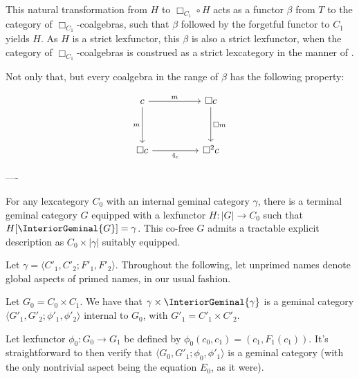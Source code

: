 This natural transformation from $H$ to $\Box_{C_1} \circ H$ acts as a functor $\beta$ from $T$ to the category of $\Box_{C_1}$-coalgebras, such that $\beta$ followed by the forgetful functor to $C_1$ yields $H$. As $H$ is a strict lexfunctor, this $\beta$ is also a strict lexfunctor, when the category of $\Box_{C_1}$-coalgebras is construed as a strict lexcategory in the manner of .

Not only that, but every coalgebra in the range of $\beta$ has the following property:

\[\begin{tikzcd}
	c && {\Box c} \\
	\\
	{\Box c} && {\Box^2 c}
	\arrow["m"', from=1-1, to=3-1]
	\arrow["m", from=1-1, to=1-3]
	\arrow["{\Box m}", from=1-3, to=3-3]
	\arrow["{4_c}"', from=3-1, to=3-3]
\end{tikzcd}\]

\closeDetails

----


\begin{construction}
For any lexcategory $C_0$ with an internal geminal category $\gamma$, there is a terminal geminal category $G$ equipped with a lexfunctor $H : |G| \to C_0$ such that $H[\InteriorGeminal{G}] = \gamma$. This co-free $G$ admits a tractable explicit description as $C_0 \times |\gamma|$ suitably equipped.
\end{construction}
\openDetails
Let $\gamma = \langle C'_1, C'_2; F'_1, F'_2 \rangle$. Throughout the following, let unprimed names denote global aspects of primed names, in our usual fashion.

Let $G_0 = C_0 \times C_1$. We have that $\gamma \times \InteriorGeminal{\gamma}$ is a geminal category $\langle G'_1, G'_2; \phi'_1, \phi'_2 \rangle$ internal to $G_0$, with $G'_1 = C'_1 \times C'_2$. 

Let lexfunctor $\phi_0 : G_0 \to G_1$ be defined by $\phi_0(c_0, c_1) = (c_1, F_1(c_1))$. It's straightforward to then verify that $\langle G_0, G'_1; \phi_0, \phi'_1 \rangle$ is a geminal category (with the only nontrivial aspect being the equation $E_0$, as it were).

